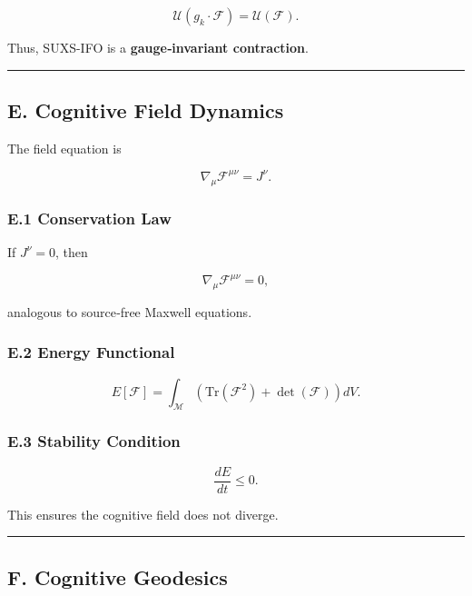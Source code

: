 \[
\mathcal{U}(g_k \cdot \mathcal{F}) = \mathcal{U}(\mathcal{F}).
\]

Thus, SUXS-IFO is a \textbf{gauge‑invariant contraction}.

\begin{center}\rule{0.5\linewidth}{0.5pt}\end{center}

\subsection{E. Cognitive Field Dynamics}\label{e.-cognitive-field-dynamics}

The field equation is

\[
\nabla_{\mu} \mathcal{F}^{\mu\nu} = J^\nu.
\]

\subsubsection{E.1 Conservation Law}\label{e.1-conservation-law}

If \(J^\nu = 0\), then

\[
\nabla_{\mu} \mathcal{F}^{\mu\nu} = 0,
\]

analogous to source‑free Maxwell equations.

\subsubsection{E.2 Energy Functional}\label{e.2-energy-functional}

\[
E[\mathcal{F}] = \int_{\mathcal{M}} \left( \text{Tr}(\mathcal{F}^2) + \det(\mathcal{F}) \right) dV.
\]

\subsubsection{E.3 Stability Condition}\label{e.3-stability-condition}

\[
\frac{dE}{dt} \le 0.
\]

This ensures the cognitive field does not diverge.

\begin{center}\rule{0.5\linewidth}{0.5pt}\end{center}

\subsection{F. Cognitive Geodesics}\label{f.-cognitive-geodesics}

